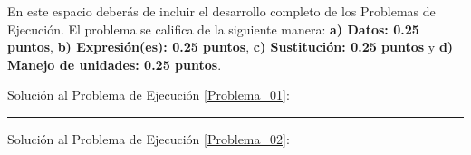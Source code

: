 \documentclass[12pt, letter]{exam}
\begin{document}
\newpage

En este espacio deberás de incluir el desarrollo completo de los Problemas de Ejecución. El problema se califica de la siguiente manera: \textbf{a) Datos: 0.25 puntos}, \textbf{b) Expresión(es): 0.25 puntos}, \textbf{c) Sustitución: 0.25 puntos} y \textbf{d) Manejo de unidades: 0.25 puntos}.

\vspace*{0.5cm}
Solución al Problema de Ejecución \ref{Problema_01}:

\vspace*{5cm}
\rule{0.9\textwidth}{0.3mm}

Solución al Problema de Ejecución \ref{Problema_02}:
\end{document}
